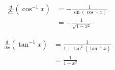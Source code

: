 \begin{example}
\begin{align*}
\frac{d}{dx}\left(\cos^{-1}x\right)&=-\frac{1}{\sin(\cos^{-1}x)}\\
&=-\frac{1}{\sqrt{1-x^2}}
\end{align*}
\end{example}
\begin{example}
\begin{align*}
\frac{d}{dx}\left(\tan^{-1}x\right)&=\frac{1}{1+\tan^2(\tan^{-1}x)}\\
&=\frac{1}{1+x^2}
\end{align*}
\end{example}

